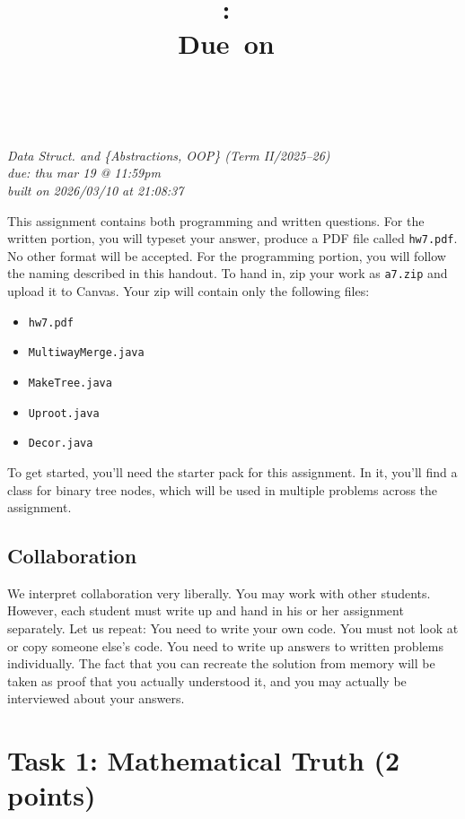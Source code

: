 \documentclass{article}
\title{
    \vspace{2in}
    \textmd{\textbf{\hmwkClass:\ \hmwkTitle}}\\
    \normalsize\vspace{0.1in}\small{Due\ on\ \hmwkDueDate}\\
    \vspace{0.1in}\large{\textit{\hmwkClassInstructor\ \hmwkClassTime}}
    \vspace{3in}
}
\author{\hmwkAuthorName}
\date{}
\theoremstyle{remark}
\begin{document}
\maketitle
\begin{center}
    \textit{Data Struct. and \{Abstractions, OOP\} (Term II/2025--26)}\\
    \textit{due: thu mar 19 @ 11:59pm}\\
    \textit{built on 2026/03/10 at 21:08:37}
\end{center}
\newpage

This assignment contains both programming and written questions. For the written portion, you will typeset your answer, produce a PDF file called \texttt{hw7.pdf}. No other format will be accepted. For the programming portion, you will follow the naming described in this handout. To hand in, zip your work as \texttt{a7.zip} and upload it to Canvas. Your zip will contain only the following files:

\begin{itemize}
    \item \texttt{hw7.pdf}
    \item \texttt{MultiwayMerge.java}
    \item \texttt{MakeTree.java}
    \item \texttt{Uproot.java}
    \item \texttt{Decor.java}
\end{itemize}

To get started, you’ll need the starter pack for this assignment. In it, you’ll find a class for binary tree nodes, which will be used in multiple problems across the assignment.

\subsection*{Collaboration}

We interpret collaboration very liberally. You may work with other students. However, each student must write up and hand in his or her assignment separately. Let us repeat: You need to write your own code. You must not look at or copy someone else’s code. You need to write up answers to written problems individually. The fact that you can recreate the solution from memory will be taken as proof that you actually understood it, and you may actually be interviewed about your answers.

\newpage

\section*{Task 1: Mathematical Truth (2 points)}
\end{document}
